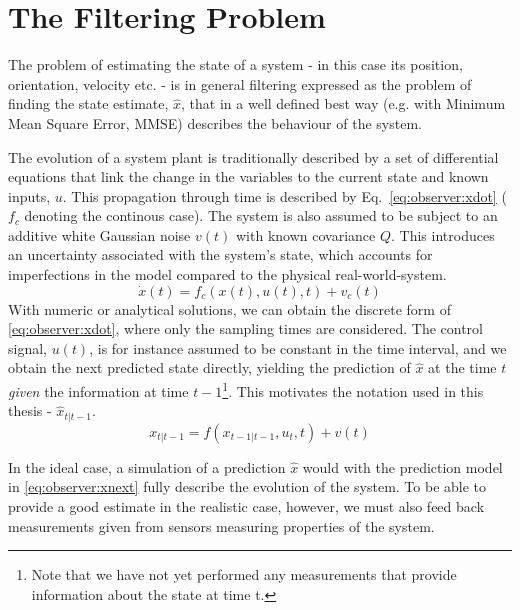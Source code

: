 \section{The Filtering Problem}
\label{sec:observer:filtering}
    The problem of estimating the state of a system - in this case
    its position, orientation, velocity etc. - is in general filtering
    expressed as the problem of finding the state estimate,
    $\hat{x}$, that in a well defined best way (e.g. with Minimum Mean Square Error, MMSE)
    describes the behaviour of the system.

    The evolution of a system plant is traditionally described by a set of differential equations
    that link the change in the variables to the current state and known inputs, $u$.
    This propagation through time is described by Eq.~\eqref{eq:observer:xdot} ($f_{c}$ denoting the continous case).
    The system is also assumed to be subject to an additive white Gaussian noise $v(t)$ with
    known covariance $Q$.
    This introduces an uncertainty associated with the system's state, which accounts
    for imperfections in the model compared to the physical real-world-system.
    \begin{equation}
        \label{eq:observer:xdot}
        \dot{x}(t) = f_{c}(x(t),u(t),t) + v_{c}(t)
    \end{equation}
    With numeric or analytical solutions, we can obtain the discrete form of
    \eqref{eq:observer:xdot}, where only the sampling times are considered.
    The control signal, $u(t)$, is for instance assumed to be constant in the time interval,
    and we obtain the next predicted state directly, yielding the prediction of $\hat{x}$
    at the time $t$ \textit{given} the information at time
    $t-1$\footnote{Note that we have not yet performed any measurements that provide information about the state at time t.}.
    This motivates the notation used in this thesis - $\hat{x}_{t|t-1}$.
    \begin{equation}
        \label{eq:observer:xnext}
        x_{t|t-1} = f(x_{t-1|t-1},u_{t},t) + v(t)
    \end{equation}

    In the ideal case, a simulation of a prediction $\hat{x}$ would
    with the prediction model in \eqref{eq:observer:xnext} fully describe
    the evolution of the system.
    To be able to provide a good estimate in the realistic case, however,
    we must also feed back measurements given from sensors measuring
    properties of the system.


